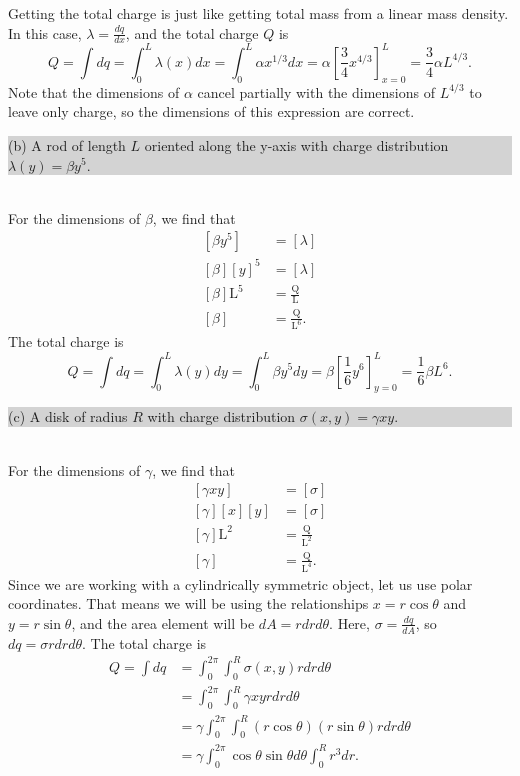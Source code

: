 \documentclass[]{article}
\newcommand{\excerpt}[1]{\colorbox{lightgray}{\parbox{14.8cm}{#1}} \\}
\begin{document}
Getting the total charge is just like getting total mass from a linear mass density. In this case, $\lambda = \frac{dq}{dx}$, and the total charge $Q$ is
\[
Q = \int dq = \int_{0}^{L}\lambda(x)dx = \int_{0}^{L} \alpha x^{1/3} dx = \alpha\left[\frac{3}{4}x^{4/3}\right]_{x=0}^{L} = \frac{3}{4}\alpha L^{4/3}.
\]
Note that the dimensions of $\alpha$ cancel partially with the dimensions of $L^{4/3}$ to leave only charge, so the dimensions of this expression are correct. \\
\excerpt{
(b) A rod of length $L$ oriented along the y-axis with charge distribution $\lambda (y) = \beta y^{5}$.
}
For the dimensions of $\beta$, we find that
\[
\begin{split}
	\left[\beta y^{5}\right] & = [\lambda] \\
	[\beta] [y]^{5} & = [\lambda] \\
	[\beta] \text{L}^{5} & = \frac{\text{Q}}{\text{L}} \\
	[\beta] & = \frac{\text{Q}}{\text{L}^{6}}.
\end{split}
\]
The total charge is
\[
Q = \int dq = \int_{0}^{L}\lambda(y)dy = \int_{0}^{L} \beta y^{5} dy = \beta\left[\frac{1}{6}y^{6}\right]_{y=0}^{L} = \frac{1}{6}\beta L^{6}.
\]
\newpage
\noindent\excerpt{
(c) A disk of radius $R$ with charge distribution $\sigma (x,y) = \gamma xy$.
}
For the dimensions of $\gamma$, we find that
\[
\begin{split}
	\left[\gamma xy\right] & = [\sigma] \\
	[\gamma] [x][y] & = [\sigma] \\
	[\gamma] \text{L}^{2} & = \frac{\text{Q}}{\text{L}^{2}} \\
	[\gamma] & = \frac{\text{Q}}{\text{L}^{4}}.
\end{split}
\]
Since we are working with a cylindrically symmetric object, let us use polar coordinates. That means we will be using the relationships $x=r\cos\theta$ and $y=r\sin\theta$, and the area element will be $dA=rdrd\theta$. Here, $\sigma = \frac{dq}{dA}$, so $dq = \sigma rdrd\theta$. The total charge is
\[
\begin{split}
	Q = \int dq & = \int_{0}^{2\pi}\int_{0}^{R}\sigma(x,y)rdrd\theta \\
	& = \int_{0}^{2\pi}\int_{0}^{R}\gamma xyrdrd\theta \\
	& = \gamma \int_{0}^{2\pi}\int_{0}^{R}(r\cos\theta)(r\sin\theta)rdrd\theta \\
	& = \gamma \int_{0}^{2\pi}\cos\theta\sin\theta d\theta \int_{0}^{R}r^{3}dr.
\end{split}
\]
\end{document}
